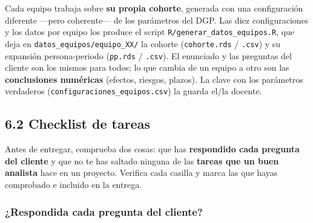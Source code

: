 \documentclass[
  letterpaper,
  DIV=11,
  numbers=noendperiod]{scrartcl}
\begin{document}
\begin{tcolorbox}[enhanced jigsaw, breakable, colframe=quarto-callout-tip-color-frame, left=2mm, arc=.35mm, colbacktitle=quarto-callout-tip-color!10!white, toprule=.15mm, colback=white, coltitle=black, rightrule=.15mm, opacitybacktitle=0.6, title=\textcolor{quarto-callout-tip-color}{\faLightbulb}\hspace{0.5em}{Cada equipo, una base de datos distinta}, titlerule=0mm, toptitle=1mm, bottomtitle=1mm, leftrule=.75mm, bottomrule=.15mm, opacityback=0]

Cada equipo trabaja sobre \textbf{su propia cohorte}, generada con una
configuración diferente ---pero coherente--- de los parámetros del DGP.
Las diez configuraciones y los datos por equipo los produce el script
\texttt{R/generar\_datos\_equipos.R}, que deja en
\texttt{datos\_equipos/equipo\_XX/} la cohorte (\texttt{cohorte.rds} /
\texttt{.csv}) y su expansión persona-periodo (\texttt{pp.rds} /
\texttt{.csv}). El enunciado y las preguntas del cliente son los mismos
para todos; lo que cambia de un equipo a otro son las
\textbf{conclusiones numéricas} (efectos, riesgos, plazos). La clave con
los parámetros verdaderos (\texttt{configuraciones\_equipos.csv}) la
guarda el/la docente.

\end{tcolorbox}

\hypertarget{sec-u16-checklist}{%
\subsection{6.2 Checklist de tareas}\label{sec-u16-checklist}}

Antes de entregar, comprueba dos cosas: que has \textbf{respondido cada
pregunta del cliente} y que no te has saltado ninguna de las
\textbf{tareas que un buen analista} hace en un proyecto. Verifica cada
casilla y marca las que hayas comprobado e incluido en la entrega.

\hypertarget{respondida-cada-pregunta-del-cliente}{%
\subsubsection{¿Respondida cada pregunta del
cliente?}\label{respondida-cada-pregunta-del-cliente}}
\end{document}

